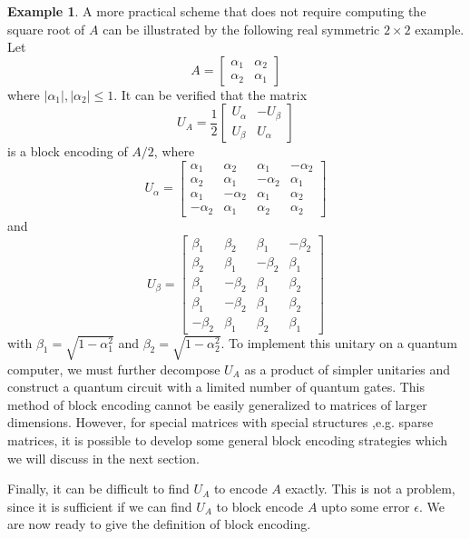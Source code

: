 \documentclass[12pt, oneside]{book}
\theoremstyle{definition}
\theoremstyle{definition}
\newtheorem{example}{Example}[section]
\theoremstyle{remark}
\begin{document}
\begin{example}
    A more practical scheme that does not require computing the square root of $A$ can be illustrated by the following real symmetric $2 \times 2$ example. Let
    \[
    A=\begin{bmatrix} \alpha_1 & \alpha_2 \\ 
    \alpha_2 & \alpha_1 \end{bmatrix}
    \]
    where $|\alpha_1|,|\alpha_2|\leq 1$. It can be verified that the matrix
    \[
    U_A =\frac{1}{2}\begin{bmatrix} U_{\alpha} & -U_{\beta} \\ U_{\beta} & U_{\alpha} \end{bmatrix}
    \]
    is a block encoding of $A/2$, where
    \[
    U_{\alpha} = \begin{bmatrix} \alpha_1 & \alpha_2 & \alpha_1 & -\alpha_2 \\ 
    \alpha_2 & \alpha_1 & -\alpha_2 & \alpha_1 \\
    \alpha_1 & -\alpha_2 & \alpha_1 & \alpha_2 \\
    -\alpha_2 & \alpha_1 & \alpha_2 & \alpha _2 \end{bmatrix}
    \]
    and
    \[
    U_{\beta} = \begin{bmatrix} \beta_1 & \beta_2 & \beta_1 & -\beta_2 \\
    \beta_2 & \beta_1 & -\beta_2 & \beta_1 \\ 
    \beta_1 & -\beta_2 & \beta_1 & \beta_2 \\
    \beta_1 & -\beta_2 & \beta_1 & \beta_2 \\
    -\beta_2 & \beta_1 & \beta_2 & \beta_1 \end{bmatrix}
    \]
    with $\beta_1 =\sqrt{1-\alpha_1^2}$ and $\beta_2 =\sqrt{1-\alpha_2^2}$. To implement this unitary on a quantum computer, we must further decompose $U_A$ as a product of simpler unitaries and construct a quantum circuit with a limited number of quantum gates. This method of block encoding cannot be easily generalized to matrices of larger dimensions. However, for special matrices with special structures ,e.g. sparse matrices, it is possible to develop some general block encoding strategies which we will discuss in the next section.
\end{example}
Finally, it can be difficult to find $U_A$ to encode $A$ exactly. This is not a problem, since it is sufficient if we can find $U_A$ to block encode $A$ upto some error $\epsilon$. We are now ready to give the definition of block encoding.
\end{document}
